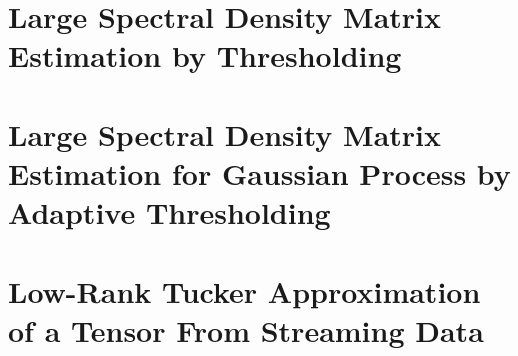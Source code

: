 \documentclass[phd,tocprelim]{cornell}
\numberwithin{equation}{section}
\begin{document}
	\chapter{Large Spectral Density Matrix Estimation by Thresholding}
	\setcounter{page}{1} 
	\addtolength{\parskip}{0.5\baselineskip}
	
	
	
	
	
	
	
	
	\clearpage
	\begin{subappendices}
	
	
	
	
	\end{subappendices}
	
	
\chapter{Large Spectral Density Matrix Estimation for Gaussian Process by Adaptive Thresholding}




\clearpage 
\begin{subappendices}




	
	\end{subappendices}
	\clearpage 
	\chapter{Low-Rank Tucker Approximation of a Tensor From Streaming Data}
	
	
	
	
	
	\clearpage
	\begin{subappendices}
	
	
	
	
	
	
	
	
	
\end{subappendices}
\clearpage 
\end{document}
